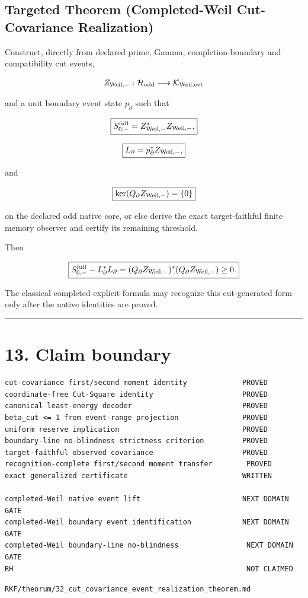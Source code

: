 \hypertarget{targeted-theorem-completed-weil-cut-covariance-realization}{%
\subsection{Targeted Theorem (Completed-Weil Cut-Covariance Realization)}\label{targeted-theorem-completed-weil-cut-covariance-realization}}

Construct, directly from declared prime, Gamma, completion-boundary and
compatibility cut events,

\[
Z_{\rm Weil,-}:
\mathcal H_{\rm odd}
\longrightarrow
\mathcal K_{\rm Weil,evt}
\]

and a unit boundary event state \(p_\partial\) such that

\[
\boxed{
S_{0,-}^{\rm full}
=Z_{\rm Weil,-}^*Z_{\rm Weil,-},
}
\]

\[
\boxed{
L_\partial
=p_\partial^*Z_{\rm Weil,-},
}
\]

and

\[
\boxed{
\ker(Q_\partial Z_{\rm Weil,-})=\{0\}
}
\]

on the declared odd native core, or else derive the exact target-faithful finite
memory observer and certify its remaining threshold.

Then

\[
\boxed{
S_{0,-}^{\rm full}-L_\partial^*L_\partial
=(Q_\partial Z_{\rm Weil,-})^*
 (Q_\partial Z_{\rm Weil,-})
\ge0.
}
\]

The classical completed explicit formula may recognize this cut-generated form
only after the native identities are proved.

\begin{center}\rule{0.5\linewidth}{0.5pt}\end{center}

\hypertarget{claim-boundary}{%
\section{13. Claim boundary}\label{claim-boundary}}

\begin{verbatim}
cut-covariance first/second moment identity             PROVED
coordinate-free Cut-Square identity                     PROVED
canonical least-energy decoder                          PROVED
beta_cut <= 1 from event-range projection               PROVED
uniform reserve implication                             PROVED
boundary-line no-blindness strictness criterion         PROVED
target-faithful observed covariance                     PROVED
recognition-complete first/second moment transfer        PROVED
exact generalized certificate                           WRITTEN

completed-Weil native event lift                        NEXT DOMAIN GATE
completed-Weil boundary event identification            NEXT DOMAIN GATE
completed-Weil boundary-line no-blindness                NEXT DOMAIN GATE
RH                                                       NOT CLAIMED
\end{verbatim}

\begin{flushright}\small\texttt{RKF/theorum/32\_cut\_covariance\_event\_realization\_theorem.md}\end{flushright}
